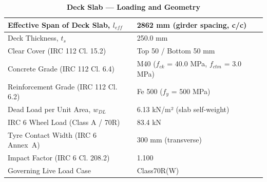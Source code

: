 \documentclass[12pt,a4paper]{report}
\numberwithin{table}{chapter}
\numberwithin{figure}{chapter}
\begin{document}
\vspace{1em}
\begin{longtable}{|L{5.5cm}|p{10.0cm}|}
\caption{\textbf{Deck Slab --- Loading and Geometry}}
\hline
\textnormal{Effective Span of Deck Slab, $l_{eff}$} & 2862 mm (girder spacing, c/c) \\[6pt]
\hline
\textnormal{Deck Thickness, $t_s$} & 250.0 mm \\[6pt]
\hline
\textnormal{Clear Cover (IRC 112 Cl. 15.2)} & Top 50 / Bottom 50 mm \\[6pt]
\hline
\textnormal{Concrete Grade (IRC 112 Cl. 6.4)} & M40 ($f_{ck}$ = 40.0 MPa, $f_{ctm}$ = 3.0 MPa) \\[6pt]
\hline
\textnormal{Reinforcement Grade (IRC 112 Cl. 6.2)} & Fe 500 ($f_y$ = 500 MPa) \\[6pt]
\hline
\textnormal{Dead Load per Unit Area, $w_{DL}$} & 6.13 kN/m² (slab self-weight) \\[6pt]
\hline
\textnormal{IRC 6 Wheel Load (Class A / 70R)} & 83.4 kN \\[6pt]
\hline
\textnormal{Tyre Contact Width (IRC 6 Annex~A)} & 300 mm (transverse) \\[6pt]
\hline
\textnormal{Impact Factor (IRC 6 Cl. 208.2)} & 1.100 \\[6pt]
\hline
\textnormal{Governing Live Load Case} & Class70R(W) \\[6pt]
\hline
\end{longtable}
\end{document}
